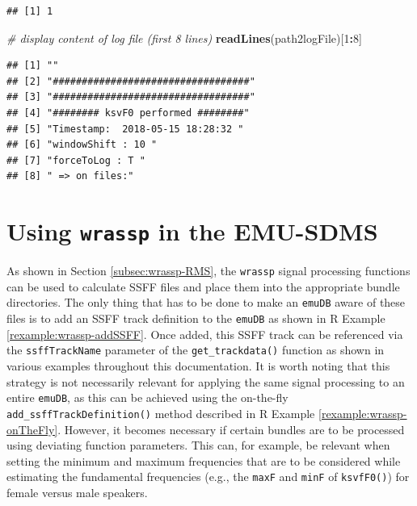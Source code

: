 \documentclass[]{book}
\newenvironment{Shaded}{\begin{snugshade}}{\end{snugshade}}
\newcommand{\CommentTok}[1]{\textcolor[rgb]{0.56,0.35,0.01}{\textit{#1}}}
\newcommand{\DecValTok}[1]{\textcolor[rgb]{0.00,0.00,0.81}{#1}}
\newcommand{\KeywordTok}[1]{\textcolor[rgb]{0.13,0.29,0.53}{\textbf{#1}}}
\newcommand{\NormalTok}[1]{#1}
\newcommand{\OperatorTok}[1]{\textcolor[rgb]{0.81,0.36,0.00}{\textbf{#1}}}
\theoremstyle{definition}
\theoremstyle{definition}
\theoremstyle{definition}
\theoremstyle{remark}
\begin{document}
\begin{verbatim}
## [1] 1
\end{verbatim}

\begin{Shaded}
\begin{Highlighting}[]
\CommentTok{# display content of log file (first 8 lines)}
\KeywordTok{readLines}\NormalTok{(path2logFile)[}\DecValTok{1}\OperatorTok{:}\DecValTok{8}\NormalTok{]}
\end{Highlighting}
\end{Shaded}

\begin{verbatim}
## [1] ""                                  
## [2] "##################################"
## [3] "##################################"
## [4] "######## ksvF0 performed ########" 
## [5] "Timestamp:  2018-05-15 18:28:32 "  
## [6] "windowShift : 10 "                 
## [7] "forceToLog : T "                   
## [8] " => on files:"
\end{verbatim}

\hypertarget{sec:wrassp_emu-sdms}{%
\section{\texorpdfstring{Using \texttt{wrassp} in the
EMU-SDMS}{Using wrassp in the EMU-SDMS}}\label{sec:wrassp_emu-sdms}}

As shown in Section \ref{subsec:wrassp-RMS}, the \texttt{wrassp} signal
processing functions can be used to calculate SSFF files and place them
into the appropriate bundle directories. The only thing that has to be
done to make an \texttt{emuDB} aware of these files is to add an SSFF
track definition to the \texttt{emuDB} as shown in R Example
\ref{rexample:wrassp-addSSFF}. Once added, this SSFF track can be
referenced via the \texttt{ssffTrackName} parameter of the
\texttt{get\_trackdata()} function as shown in various examples
throughout this documentation. It is worth noting that this strategy is
not necessarily relevant for applying the same signal processing to an
entire \texttt{emuDB}, as this can be achieved using the on-the-fly
\texttt{add\_ssffTrackDefinition()} method described in R Example
\ref{rexample:wrassp-onTheFly}. However, it becomes necessary if certain
bundles are to be processed using deviating function parameters. This
can, for example, be relevant when setting the minimum and maximum
frequencies that are to be considered while estimating the fundamental
frequencies (e.g., the \texttt{maxF} and \texttt{minF} of
\texttt{ksvfF0()}) for female versus male speakers.
\end{document}
